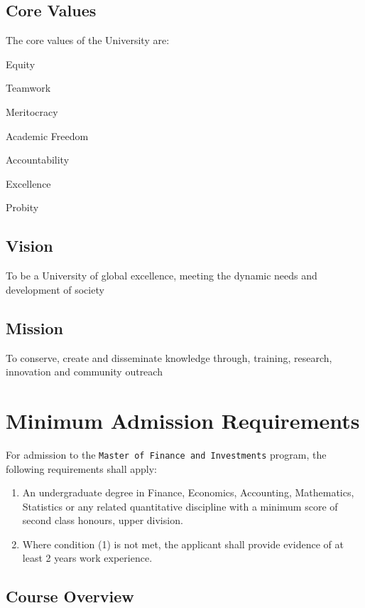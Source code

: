\documentclass[16,a4paperpaper,]{article}
\begin{document}
\subsection{Core Values}

The core values of the University are:

\begin{center}

Equity

Teamwork

Meritocracy

Academic Freedom

Accountability

Excellence

Probity

\end{center}

\subsection{Vision}

To be a University of global excellence, meeting the dynamic needs and
development of society

\subsection{Mission}

To conserve, create and disseminate knowledge through, training,
research, innovation and community outreach

\section{Minimum Admission Requirements}

For admission to the \texttt{Master\ of\ Finance\ and\ Investments}
program, the following requirements shall apply:

\begin{enumerate}
\def\labelenumi{\arabic{enumi}.}
\item
  An undergraduate degree in Finance, Economics, Accounting,
  Mathematics, Statistics or any related quantitative discipline with a
  minimum score of second class honours, upper division.
\item
  Where condition (1) is not met, the applicant shall provide evidence
  of at least 2 years work experience.
\end{enumerate}

\subsection{Course Overview}
\end{document}
